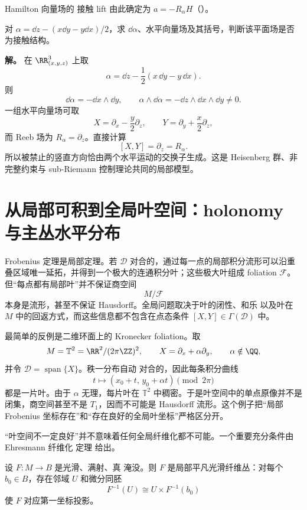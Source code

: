Hamilton 向量场的 接触 lift 由此确定为 $a=-R_\alpha H$（）。

\begin{exbox}[三维 Heisenberg 接触 结构]
对 $\alpha=\dd z-(x\dd y-y\dd x)/2$，求 $\dd\alpha$、水平向量场及其括号，判断该平面场是否为接触结构。

\textbf{解。} 在 $\RR^3_{(x,y,z)}$ 上取
\[
\alpha=\dd z-\frac12(x\,\dd y-y\,\dd x).
\]
则
\[
\dd\alpha=-\dd x\wedge\dd y,
\qquad
\alpha\wedge\dd\alpha=-\dd z\wedge\dd x\wedge\dd y\neq0.
\]
一组水平向量场可取
\[
X=\partial_x-\frac y2\partial_z,
\qquad
Y=\partial_y+\frac x2\partial_z,
\]
而 Reeb 场为 $R_\alpha=\partial_z$。直接计算
\[
[X,Y]=\partial_z=R_\alpha.
\]
所以被禁止的竖直方向恰由两个水平运动的交换子生成。这是 Heisenberg 群、非完整约束与 sub-Riemann 控制理论共同的局部模型。
\end{exbox}



\section{从局部可积到全局叶空间：holonomy 与主丛水平分布}

Frobenius 定理是局部定理。若 $\mathcal D$ 对合的，通过每一点的局部积分流形可以沿重叠区域唯一延拓，并得到一个极大的连通积分叶；这些极大叶组成 foliation $\mathcal F$。但“每点都有局部叶”并不保证商空间
\[
 M/\mathcal F
\]
本身是流形，甚至不保证 Hausdorff。全局问题取决于叶的闭性、和乐 以及叶在 $M$ 中的回返方式，而这些信息都不包含在点态条件 $[X,Y]\in\Gamma(\mathcal D)$ 中。

最简单的反例是二维环面上的 Kronecker foliation。取
\[
 M=\mathbb T^2=\RR^2/(2\pi\ZZ)^2,
 \qquad
 X=\partial_x+\alpha\partial_y,
 \qquad
 \alpha\notin\QQ,
\]
并令 $\mathcal D=\operatorname{span}\{X\}$。秩一分布自动 对合的，因此每条积分曲线
\[
 t\longmapsto
 (x_0+t,\,y_0+\alpha t)\pmod{2\pi}
\]
都是一片叶。由于 $\alpha$ 无理，每片叶在 $\mathbb T^2$ 中稠密。于是叶空间中的单点原像并不是闭集，商空间甚至不是 $T_1$，因而不可能是 Hausdorff 流形。这个例子把“局部 Frobenius 坐标存在”和“存在良好的全局叶坐标”严格区分开。

“叶空间不一定良好”并不意味着任何全局纤维化都不可能。一个重要充分条件由 Ehresmann 纤维化 定理 给出。

\begin{theorem}\label{thm:math-dg-ehresmann-fibration}
设 $F:M\to B$ 是光滑、满射、真 淹没。则 $F$ 是局部平凡光滑纤维丛：对每个 $b_0\in B$，存在邻域 $U$ 和微分同胚
\begin{equation}
F^{-1}(U)\cong U\times F^{-1}(b_0)
\label{eq:math-dg-ehresmann-local-trivialization}
\end{equation}
使 $F$ 对应第一坐标投影。
\end{theorem}

